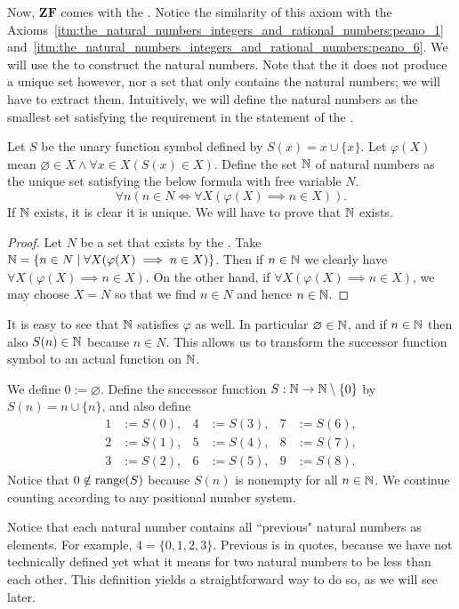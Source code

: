 \documentclass[../main.tex]{subfiles}
\begin{document}
Now, $\mathbf{ZF}$ comes with the . Notice the similarity of this axiom with the Axioms~\ref{itm:the_natural_numbers_integers_and_rational_numbers:peano_1}~and~\ref{itm:the_natural_numbers_integers_and_rational_numbers:peano_6}. We will use the  to construct the natural numbers. Note that the it does not produce a unique set however, nor a set that only contains the natural numbers; we will have to extract them. Intuitively, we will define the natural numbers as the smallest set satisfying the requirement in the statement of the .
\begin{definition}\label{dfn:the_natural_numbers_integers_and_rational_numbers:natural_numbers}
    Let $S$ be the unary function symbol defined by $S(x)=x\cup\{x\}$. Let $\varphi(X)$ mean $\varnothing\in X\land\forall x\in X(S(x)\in X)$. Define the set $\mathbb{N}$ of natural numbers as the unique set satisfying the below formula with free variable $N$.
    \begin{equation*}
        \forall n(n\in N\iff\forall X(\varphi(X)\implies n\in X)).
    \end{equation*}
    If $\mathbb{N}$ exists, it is clear it is unique. We will have to prove that $\mathbb{N}$ exists.
\end{definition}
\begin{proof}
    Let $N$ be a set that exists by the . Take $\mathbb{N}=\{n\in N\mid\forall X(\varphi(X)\implies n\in X)\}$. Then if $n\in\mathbb{N}$ we clearly have $\forall X(\varphi(X)\implies n\in X)$. On the other hand, if $\forall X(\varphi(X)\implies n\in X)$, we may choose $X=N$ so that we find $n\in N$ and hence $n\in\mathbb{N}$.
\end{proof}
It is easy to see that $\mathbb{N}$ satisfies $\varphi$ as well. In particular $\varnothing\in\mathbb{N}$, and if $n\in\mathbb{N}$ then also $S(n)\in\mathbb{N}$ because $n\in N$. This allows us to transform the successor function symbol to an actual function on $\mathbb{N}$.
\begin{definition}
    We define $0:=\varnothing$. Define the successor function $S:\mathbb{N}\to\mathbb{N}\setminus\{0\}$ by $S(n)=n\cup\{n\}$, and also define
    \begin{align*}
        1 & :=S(0), & 4 & :=S(3), & 7 & :=S(6), \\
        2 & :=S(1), & 5 & :=S(4), & 8 & :=S(7), \\
        3 & :=S(2), & 6 & :=S(5), & 9 & :=S(8).
    \end{align*}
    Notice that $0\notin\operatorname{range}(S)$ because $S(n)$ is nonempty for all $n\in\mathbb{N}$. We continue counting according to any positional number system.
\end{definition}
Notice that each natural number contains all ``previous" natural numbers as elements. For example, $4=\{0,1,2,3\}$. Previous is in quotes, because we have not technically defined yet what it means for two natural numbers to be less than each other. This definition yields a straightforward way to do so, as we will see later.
\end{document}
